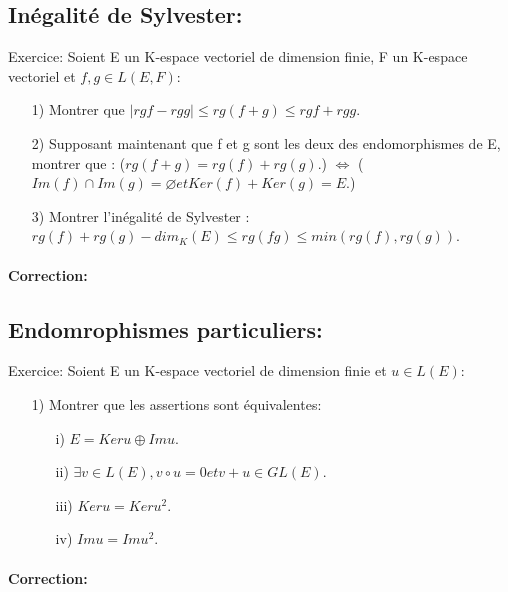 \documentclass{book}
\begin{document}
\subsection{Inégalité de Sylvester:}
\begin{Ex}[]{Exercice:}{}
Soient E un K-espace vectoriel de dimension finie, F un K-espace vectoriel et \(f,g \in L(E,F)\):
\\ \begin{itemize}
    \item[1)] Montrer que \(|rg f- rg g| \leq rg(f+g) \leq rg f + rg g\).
    \item[2)] Supposant maintenant que f et g sont les deux des endomorphismes de E, montrer que :
    (\(rg(f+g)=rg(f)+rg(g).\)) \(\Leftrightarrow\) (\(Im(f) \cap Im(g)={\varnothing} et Ker(f)+Ker(g)=E\).)
    \item[3)] Montrer l'inégalité de Sylvester : 
    \\ \(rg(f)+rg(g)-dim_{K}(E) \leq rg(fg) \leq min(rg(f),rg(g))\). 
\end{itemize}
\end{Ex}
\paragraph{Correction:}
\subsection{Endomrophismes particuliers: }
\begin{Ex}[]{Exercice:}{}
Soient E un K-espace vectoriel de dimension finie et \(u \in L(E)\):
\\ \begin{itemize}
    \item[1)] Montrer que les assertions sont équivalentes:
    \begin{itemize}
        \item[i)] \(E=Ker u \oplus Im u\).
        \item[ii)] \(\exists v \in L(E), v\circ u =0 et v+u \in GL(E)\).
        \item[iii)] \(Ker u = Ker u^2\).
        \item[iv)] \(Im u = Im u^2\).
        \end{itemize}
\end{itemize}
\end{Ex}
\paragraph{Correction:}
\end{document}
